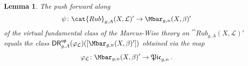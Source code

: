 \documentclass[a4paper,12pt]{article} %
\newcommand{\MWvone}[1]{}%
\newcommand{\ca}[1]{{\mathcal{#1}}}
\theoremstyle{definition}
\theoremstyle{plain}%
\newtheorem{lemma}[definition]{Lemma}
\newcommand{\MbarX}{\Mbar_{g,n}(X, \beta)}
\renewcommand{\phi}{\varphi}
\newcommand{\Picabs}{\mathfrak{Pic}}
\newcommand{\DRop}{\mathsf{DR}^{\mathsf{op}}}
\begin{document}






\begin{lemma}\label{lem:DRop_eq_MW}
The push forward along
$$\psi\colon \cat{Rub}_{g,A}(X, \ca L)' \to \MbarX'$$
of the virtual fundamental class of the Marcus-Wise theory
on $\cat{Rub}_{g,A}(X, \ca L)'$ 
equals the class $\DRop_{g,A}(\phi_\ca L)([\MbarX'])$
obtained via the map
$$\phi_\ca L\colon \MbarX' \to \Picabs_{g,n}\, .$$
\end{lemma}
\end{document}
